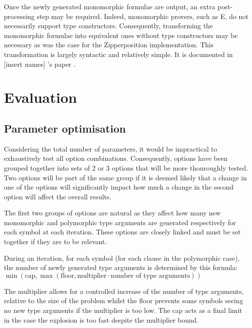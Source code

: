 \documentclass[]{ceurart}
\begin{document}
Once the newly generated monomorphic formulae are output, an extra post-processing step may be required. Indeed, monomorphic provers, such as E, do not necessarily support type constructors. Consequently, transforming the monomorphic formulae into equivalent ones without type constructors may be necessary as was the case for the Zipperposition implementation. This transformation is largely syntactic and relatively simple. It is documented in [insert names] 's paper \cite[Sections 4 and 5]{mono-trans}.

\section{Evaluation}
\label{sec:evaluation}


\subsection{Parameter optimisation}
\label{param_opti}

Considering the total number of parameters, it would be impractical to exhaustively test all option combinations. Consequently, options have been grouped together into sets of 2 or 3 options that will be more thouroughly tested. Two options will be part of the same group if it is deemed likely that a change in one of the options will significantly impact how much a change in the second option will affect the overall results.

The first two groups of options are natural as they affect how many new monomorphic and polymorphic type arguments are generated respectively for each symbol at each iteration. These options are closely linked and must be set together if they are to be relevant.

During an iteration, for each symbol (for each clause in the polymorphic case), the number of newly generated type arguments is determined by this formula:
\( \min(\text{cap}, \max(\text{floor}, \text{multiplier} \cdot \text{number of type arguments})) \)

The multiplier allows for a controlled increase of the number of type arguments, relative to the size of the problem whilst the floor prevents some symbols seeing no new type arguments if the multiplier is too low.
The cap acts as a final limit in the case the explosion is too fast despite the multiplier bound.
\end{document}
